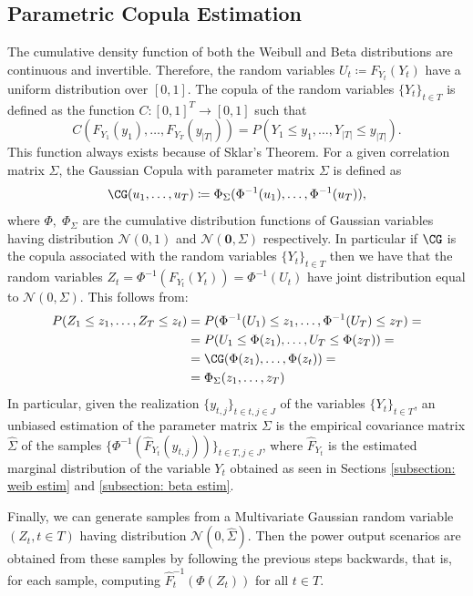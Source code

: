 \documentclass[smallextended,natbib]{svjour3}       %
\numberwithin{definition}{section}
\numberwithin{theorem}{section}
\numberwithin{proposition}{section}
\begin{document}
\subsection{Parametric Copula Estimation}
The cumulative density function of both the Weibull and Beta distributions are continuous and invertible. 
Therefore, the random variables \( U_t \coloneqq F_{Y_t}(Y_t) \) have a uniform distribution over \([0,1]\). 
The copula of the random variables \(\{Y_t\}_{t \in T}\) is defined as the function \(C: [0,1]^T \to [0,1]\) such that 
\begin{equation}
C(F_{Y_1}(y_1), \ldots, F_{Y_T}(y_{|T|})) = P(Y_1 \leq y_1, \ldots, Y_{|T|} \leq y_{|T|}).
\end{equation}
This function always exists because of Sklar's Theorem. 
For a given correlation matrix \(\Sigma\), the Gaussian Copula with parameter matrix \(\Sigma\) is defined as 
\[\CG(u_1,\ldots,u_{T}) \coloneqq \Phi_{\Sigma}(\Phi^{-1}(u_1),\ldots, \Phi^{-1}(u_T)),\] 
where \(\Phi,\; \Phi_{\Sigma}\) are the cumulative distribution functions of Gaussian variables having distribution \(\mathcal{N}(0,1)\) and \( \mathcal{N}(\mathbf{0},\Sigma)\) respectively. 
In particular if \(\CG\) is the copula associated with the random variables \(\{Y_t\}_{t \in T}\) then we have that the random variables \(Z_t = \Phi^{-1}(F_{Y_t}(Y_t)) = \Phi^{-1}(U_t)\) have joint distribution equal to \(\mathcal{N}(0, \Sigma)\). 
This follows from:
\begin{align*}
P(Z_1 \leq z_1, \ldots, Z_T \leq z_t) &= P(\Phi^{-1}(U_1) \leq z_1, \ldots, \Phi^{-1}(U_T) \leq z_T) = \\
&= P(U_1 \leq \Phi(z_1), \ldots, U_T \leq \Phi(z_T)) = \\
&= \CG(\Phi(z_1), \ldots, \Phi(z_t)) =  \\
&= \Phi_{\Sigma}(z_1, \ldots, z_T)
\end{align*}
In particular, given the realization \(\{y_{t,j}\}_{t \in t, j \in J}\) of the variables \(\{Y_t\}_{t \in T}\), an unbiased estimation of the parameter matrix \(\Sigma\) is the empirical covariance matrix \(\hat \Sigma\) of the samples \(\{\Phi^{-1}(\hat{F}_{Y_t}(y_{t,j}))\}_{t\in T, j \in J}\), where \(\hat{F}_{Y_t}\) is the estimated marginal distribution of the variable \(Y_t\) obtained as seen in Sections \ref{subsection: weib estim} and \ref{subsection: beta estim}.

Finally, we can generate samples from a Multivariate Gaussian random variable \((Z_{t}, t \in T)\) having distribution \(\mathcal{N}(0, \hat \Sigma)\).
Then the power output scenarios are obtained from these samples by following the previous steps backwards, that is, for each sample, computing \(\hat F_{t}^{-1}(\Phi(Z_{t}))\) for all \(t\in T\). 
\end{document}
